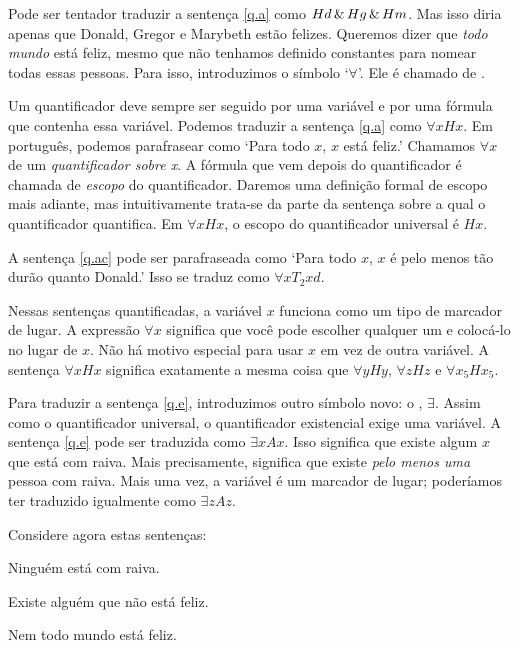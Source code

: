 Pode ser tentador traduzir a sentença \ref{q.a} como $Hd \,\&\, Hg \,\&\, Hm$. Mas isso diria apenas que Donald, Gregor e Marybeth estão felizes. Queremos dizer que \emph{todo mundo} está feliz, mesmo que não tenhamos definido constantes para nomear todas essas pessoas. Para isso, introduzimos o símbolo `$\forall$'. Ele é chamado de .

Um quantificador deve sempre ser seguido por uma variável e por uma fórmula que contenha essa variável. Podemos traduzir a sentença \ref{q.a} como $\forall x Hx$. Em português, podemos parafrasear como `Para todo $x$, $x$ está feliz.'
Chamamos $\forall x$ de um \emph{quantificador sobre x}. A fórmula que vem depois do quantificador é chamada de \emph{escopo} do quantificador. Daremos uma definição formal de escopo mais adiante, mas intuitivamente trata-se da parte da sentença sobre a qual o quantificador quantifica. Em $\forall x Hx$, o escopo do quantificador universal é $Hx$.

A sentença \ref{q.ac} pode ser parafraseada como `Para todo $x$, $x$ é pelo menos tão durão quanto Donald.' Isso se traduz como $\forall x T_2xd$.

Nessas sentenças quantificadas, a variável $x$ funciona como um tipo de marcador de lugar. A expressão $\forall x$ significa que você pode escolher qualquer um e colocá-lo no lugar de $x$. Não há motivo especial para usar $x$ em vez de outra variável. A sentença $\forall x Hx$ significa exatamente a mesma coisa que $\forall y Hy$, $\forall z Hz$ e $\forall x_5 Hx_5$.

Para traduzir a sentença \ref{q.e}, introduzimos outro símbolo novo: o , $\exists$. Assim como o quantificador universal, o quantificador existencial exige uma variável. A sentença \ref{q.e} pode ser traduzida como $\exists x Ax$. Isso significa que existe algum $x$ que está com raiva. Mais precisamente, significa que existe \emph{pelo menos uma} pessoa com raiva. Mais uma vez, a variável é um marcador de lugar; poderíamos ter traduzido igualmente como $\exists z Az$.

Considere agora estas sentenças:
\begin{earg}
\item[\ex{q.ne}] Ninguém está com raiva.
\item[\ex{q.en}] Existe alguém que não está feliz.
\item[\ex{q.na}] Nem todo mundo está feliz.
\end{earg}

